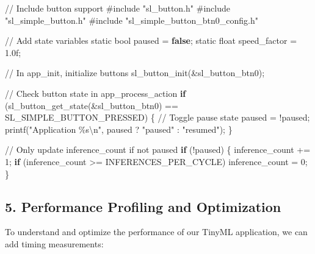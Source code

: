 \documentclass[
  9pt,
  letterpaper,
  abstract,
  titlepage]{scrbook}
\newenvironment{Shaded}{\begin{snugshade}}{\end{snugshade}}
\newcommand{\BuiltInTok}[1]{\textcolor[rgb]{0.00,0.23,0.31}{#1}}
\newcommand{\CommentTok}[1]{\textcolor[rgb]{0.37,0.37,0.37}{#1}}
\newcommand{\ControlFlowTok}[1]{\textcolor[rgb]{0.00,0.23,0.31}{\textbf{#1}}}
\newcommand{\DataTypeTok}[1]{\textcolor[rgb]{0.68,0.00,0.00}{#1}}
\newcommand{\DecValTok}[1]{\textcolor[rgb]{0.68,0.00,0.00}{#1}}
\newcommand{\FloatTok}[1]{\textcolor[rgb]{0.68,0.00,0.00}{#1}}
\newcommand{\ImportTok}[1]{\textcolor[rgb]{0.00,0.46,0.62}{#1}}
\newcommand{\KeywordTok}[1]{\textcolor[rgb]{0.00,0.23,0.31}{\textbf{#1}}}
\newcommand{\NormalTok}[1]{\textcolor[rgb]{0.00,0.23,0.31}{#1}}
\newcommand{\OperatorTok}[1]{\textcolor[rgb]{0.37,0.37,0.37}{#1}}
\newcommand{\PreprocessorTok}[1]{\textcolor[rgb]{0.68,0.00,0.00}{#1}}
\newcommand{\SpecialCharTok}[1]{\textcolor[rgb]{0.37,0.37,0.37}{#1}}
\newcommand{\StringTok}[1]{\textcolor[rgb]{0.13,0.47,0.30}{#1}}
\begin{document}
\begin{Shaded}
\begin{Highlighting}[]
\CommentTok{// Include button support}
\PreprocessorTok{\#include }\ImportTok{"sl\_button.h"}
\PreprocessorTok{\#include }\ImportTok{"sl\_simple\_button.h"}
\PreprocessorTok{\#include }\ImportTok{"sl\_simple\_button\_btn0\_config.h"}

\CommentTok{// Add state variables}
\DataTypeTok{static} \DataTypeTok{bool}\NormalTok{ paused }\OperatorTok{=} \KeywordTok{false}\OperatorTok{;}
\DataTypeTok{static} \DataTypeTok{float}\NormalTok{ speed\_factor }\OperatorTok{=} \FloatTok{1.0}\BuiltInTok{f}\OperatorTok{;}

\CommentTok{// In app\_init, initialize buttons}
\NormalTok{sl\_button\_init}\OperatorTok{(\&}\NormalTok{sl\_button\_btn0}\OperatorTok{);}

\CommentTok{// Check button state in app\_process\_action}
\ControlFlowTok{if} \OperatorTok{(}\NormalTok{sl\_button\_get\_state}\OperatorTok{(\&}\NormalTok{sl\_button\_btn0}\OperatorTok{)} \OperatorTok{==}\NormalTok{ SL\_SIMPLE\_BUTTON\_PRESSED}\OperatorTok{)} \OperatorTok{\{}
  \CommentTok{// Toggle pause state}
\NormalTok{  paused }\OperatorTok{=} \OperatorTok{!}\NormalTok{paused}\OperatorTok{;}
\NormalTok{  printf}\OperatorTok{(}\StringTok{"Application }\SpecialCharTok{\%s\textbackslash{}n}\StringTok{"}\OperatorTok{,}\NormalTok{ paused }\OperatorTok{?} \StringTok{"paused"} \OperatorTok{:} \StringTok{"resumed"}\OperatorTok{);}
\OperatorTok{\}}

\CommentTok{// Only update inference\_count if not paused}
\ControlFlowTok{if} \OperatorTok{(!}\NormalTok{paused}\OperatorTok{)} \OperatorTok{\{}
\NormalTok{  inference\_count }\OperatorTok{+=} \DecValTok{1}\OperatorTok{;}
  \ControlFlowTok{if} \OperatorTok{(}\NormalTok{inference\_count }\OperatorTok{\textgreater{}=}\NormalTok{ INFERENCES\_PER\_CYCLE}\OperatorTok{)}\NormalTok{ inference\_count }\OperatorTok{=} \DecValTok{0}\OperatorTok{;}
\OperatorTok{\}}
\end{Highlighting}
\end{Shaded}

\subsection{5. Performance Profiling and
Optimization}\label{performance-profiling-and-optimization}

To understand and optimize the performance of our TinyML application, we
can add timing measurements:
\end{document}
